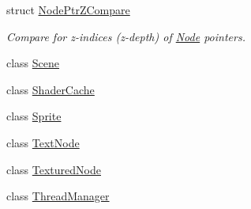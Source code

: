 \begin{DoxyCompactItemize}
struct \mbox{\hyperlink{structsage_1_1NodePtrZCompare}{Node\+Ptr\+Z\+Compare}}
\begin{DoxyCompactList}\small\item\em Compare for z-\/indices (z-\/depth) of \mbox{\hyperlink{classsage_1_1Node}{Node}} pointers. \end{DoxyCompactList}\item 
class \mbox{\hyperlink{classsage_1_1Scene}{Scene}}
\item 
class \mbox{\hyperlink{classsage_1_1ShaderCache}{Shader\+Cache}}
\item 
class \mbox{\hyperlink{classsage_1_1Sprite}{Sprite}}
\item 
class \mbox{\hyperlink{classsage_1_1TextNode}{Text\+Node}}
\item 
class \mbox{\hyperlink{classsage_1_1TexturedNode}{Textured\+Node}}
\item 
class \mbox{\hyperlink{classsage_1_1ThreadManager}{Thread\+Manager}}
\end{DoxyCompactItemize}
